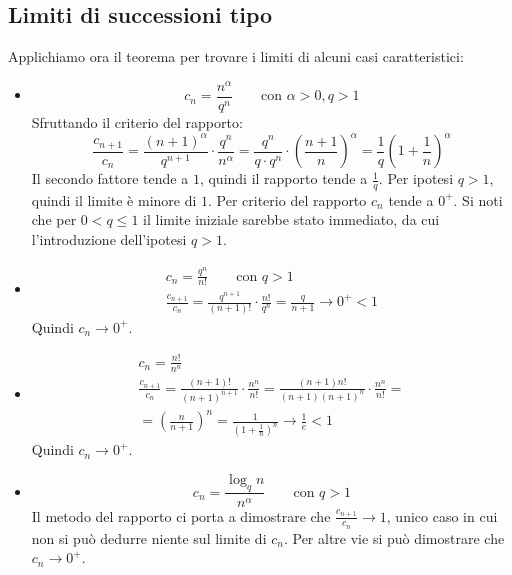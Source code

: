 \subsection{Limiti di successioni tipo}
Applichiamo ora il teorema per trovare i limiti di alcuni casi caratteristici:
\begin{itemize}
	\item
	      \[
		      c_n=\frac{n^\alpha}{q^n}\qquad\text{con }\alpha>0,q>1
	      \]
	      Sfruttando il criterio del rapporto:
	      \[
		      \frac{c_{n+1}}{c_n}=\frac{(n+1)^\alpha}{q^{n+1}}\cdot \frac{q^n}{n^\alpha}=\frac{q^n}{q\cdot q^n}\cdot \left(\frac{n+1}{n}\right)^\alpha=\frac{1}{q}\left(1+\frac{1}{n}\right)^\alpha
	      \]
	      Il secondo fattore tende a $1$, quindi il rapporto tende a $\frac{1}{q}$. Per ipotesi $q>1$, quindi il limite è minore di $1$. Per criterio del rapporto $c_n$ tende a $0^+$. Si noti che per $0<q\leq1$ il limite iniziale sarebbe stato immediato, da cui l'introduzione dell'ipotesi $q>1$.
	\item
	      \begin{gather*}
		      c_n=\frac{q^n}{n!}\qquad\text{con }q>1\\
		      \frac{c_{n+1}}{c_n}=\frac{q^{n+1}}{(n+1)!}\cdot \frac{n!}{q^n}=\frac{q}{n+1}\to0^+<1
	      \end{gather*}
	      Quindi $c_n\to0^+$.
	\item
	      \begin{gather*}
		      c_n=\frac{n!}{n^n}\\
		      \frac{c_{n+1}}{c_n}=\frac{(n+1)!}{(n+1)^{n+1}}\cdot \frac{n^n}{n!}=\frac{(n+1)n!}{(n+1)(n+1)^n}\cdot \frac{n^n}{n!}=\\
		      =\left(\frac{n}{n+1}\right)^n=\frac{1}{\left(1+\frac{1}{n}\right)^n}\to\frac{1}{e}<1
	      \end{gather*}
	      Quindi $c_n\to0^+$.
	\item
	      \[
		      c_n=\frac{\log_q n}{n^\alpha}\qquad\text{con }q>1
	      \]
	      Il metodo del rapporto ci porta a dimostrare che $\frac{c_{n+1}}{c_n}\to1$, unico caso in cui non si può dedurre niente sul limite di $c_n$. Per altre vie si può dimostrare che $c_n\to0^+$.
\end{itemize}
